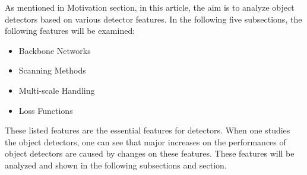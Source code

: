 \documentclass{article}
\begin{document}
\setlength{\parindent}{6ex}

\indent

As mentioned in Motivation section, in this article, the aim is to analyze 
object detectors based on various detector features. In the following five 
subsections, the following features will be examined:
\begin{itemize}
    \item Backbone Networks
    \item Scanning Methods
    \item Multi-scale Handling
    \item Loss Functions
\end{itemize} 
\indent 

These listed features are the essential features for detectors. When one 
studies the object detectors, one can see that major increases on the 
performances of object detectors are caused by changes on these features. 
These features will be analyzed and shown in the following subsections and 
section.
\end{document}
